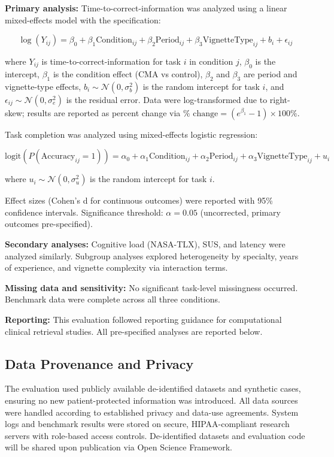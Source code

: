 \documentclass[preprint,12pt]{elsarticle}
\begin{document}
\textbf{Primary analysis:} Time-to-correct-information was analyzed using a linear mixed-effects model with the specification:

\begin{equation}
\log(Y_{ij}) = \beta_0 + \beta_1 \text{Condition}_{ij} + \beta_2 \text{Period}_{ij} + \beta_3 \text{VignetteType}_{ij} + b_i + \epsilon_{ij}
\end{equation}

where $Y_{ij}$ is time-to-correct-information for task $i$ in condition $j$, $\beta_0$ is the intercept, $\beta_1$ is the condition effect (CMA vs control), $\beta_2$ and $\beta_3$ are period and vignette-type effects, $b_i \sim \mathcal{N}(0, \sigma_b^2)$ is the random intercept for task $i$, and $\epsilon_{ij} \sim \mathcal{N}(0, \sigma_e^2)$ is the residual error. Data were log-transformed due to right-skew; results are reported as percent change via $\% \text{ change} = (e^{\beta_1} - 1) \times 100\%$.

Task completion was analyzed using mixed-effects logistic regression:

\begin{equation}
\text{logit}(P(\text{Accuracy}_{ij} = 1)) = \alpha_0 + \alpha_1 \text{Condition}_{ij} + \alpha_2 \text{Period}_{ij} + \alpha_3 \text{VignetteType}_{ij} + u_i
\end{equation}

where $u_i \sim \mathcal{N}(0, \sigma_u^2)$ is the random intercept for task $i$.

Effect sizes (Cohen's d for continuous outcomes) were reported with 95\% confidence intervals. Significance threshold: $\alpha = 0.05$ (uncorrected, primary outcomes pre-specified).

\textbf{Secondary analyses:} Cognitive load (NASA-TLX), SUS, and latency were analyzed similarly. Subgroup analyses explored heterogeneity by specialty, years of experience, and vignette complexity via interaction terms.

\textbf{Missing data and sensitivity:} No significant task-level missingness occurred. Benchmark data were complete across all three conditions.

\textbf{Reporting:} This evaluation followed reporting guidance for computational clinical retrieval studies. All pre-specified analyses are reported below.

\subsection{Data Provenance and Privacy}
The evaluation used publicly available de-identified datasets and synthetic cases, ensuring no new patient-protected information was introduced. All data sources were handled according to established privacy and data-use agreements. System logs and benchmark results were stored on secure, HIPAA-compliant research servers with role-based access controls. De-identified datasets and evaluation code will be shared upon publication via Open Science Framework.
\end{document}
